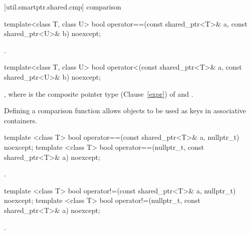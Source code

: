 [util.smartptr.shared.cmp]{ comparison}

%
\begin{itemdecl}
template<class T, class U>
  bool operator==(const shared_ptr<T>& a, const shared_ptr<U>& b) noexcept;
\end{itemdecl}

\begin{itemdescr}
\pnum
\returns {}.
\end{itemdescr}

%
\begin{itemdecl}
template<class T, class U>
  bool operator<(const shared_ptr<T>& a, const shared_ptr<U>& b) noexcept;
\end{itemdecl}

\begin{itemdescr}
\pnum
\returns {},
where  is the composite pointer type (Clause~\ref{expr})
of  and .

\pnum
\begin{note}
Defining a comparison function allows  objects to be
used as keys in associative containers.
\end{note}
\end{itemdescr}

%
\begin{itemdecl}
template <class T>
  bool operator==(const shared_ptr<T>& a, nullptr_t) noexcept;
template <class T>
  bool operator==(nullptr_t, const shared_ptr<T>& a) noexcept;
\end{itemdecl}

\begin{itemdescr}
\pnum
\returns {}.
\end{itemdescr}

%
\begin{itemdecl}
template <class T>
  bool operator!=(const shared_ptr<T>& a, nullptr_t) noexcept;
template <class T>
  bool operator!=(nullptr_t, const shared_ptr<T>& a) noexcept;
\end{itemdecl}

\begin{itemdescr}
\pnum
\returns {}.
\end{itemdescr}

